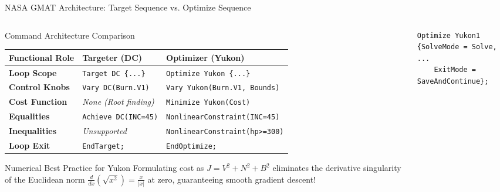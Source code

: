 \documentclass[aspectratio=169, 10pt]{beamer}
\begin{document}
\begin{frame}[fragile]{NASA GMAT Architecture: Target Sequence vs. Optimize Sequence}
    \begin{columns}[t]
        \begin{column}{0.47\textwidth}
            \begin{block}{Command Architecture Comparison}
                \centering
                \fontsize{5.0pt}{5.8pt}\selectfont
                \setlength{\tabcolsep}{1.6pt}
                \begin{tabular}{lll}
                    \toprule
                    \textbf{Functional Role} & \textbf{Targeter (DC)} & \textbf{Optimizer (Yukon)} \\ \midrule
                    \textbf{Loop Scope}      & \texttt{Target DC \{...\}}    & \texttt{Optimize Yukon \{...\}} \\
                    \textbf{Control Knobs}   & \texttt{Vary DC(Burn.V1)}     & \texttt{Vary Yukon(Burn.V1, Bounds)} \\
                    \textbf{Cost Function}   & \textit{None (Root finding)}  & \texttt{Minimize Yukon(Cost)} \\
                    \textbf{Equalities}      & \texttt{Achieve DC(INC=45)}   & \texttt{NonlinearConstraint(INC=45)} \\
                    \textbf{Inequalities}    & \textit{Unsupported}         & \texttt{NonlinearConstraint(hp>=300)} \\
                    \textbf{Loop Exit}       & \texttt{EndTarget;}           & \texttt{EndOptimize;} \\ \bottomrule
                \end{tabular}
            \end{block}

            \vspace{-0.08cm}

            \begin{exampleblock}{Numerical Best Practice for Yukon}
                \scriptsize
                Formulating cost as $J = V^2 + N^2 + B^2$ eliminates the derivative singularity of the Euclidean norm $\frac{d}{dx}(\sqrt{x^2}) = \frac{x}{\vert{}x\vert{}}$ at zero, guaranteeing smooth gradient descent!
            \end{exampleblock}
        \end{column}

        \begin{column}{0.51\textwidth}
\begin{lstlisting}[style=gmatcompact]
% OPTIMIZATION SEQUENCE IN NASA GMAT
Optimize Yukon1 {SolveMode = Solve, ...
    ExitMode = SaveAndContinue};


\end{lstlisting}
\end{column}
\end{columns}
\end{frame}
\end{document}
